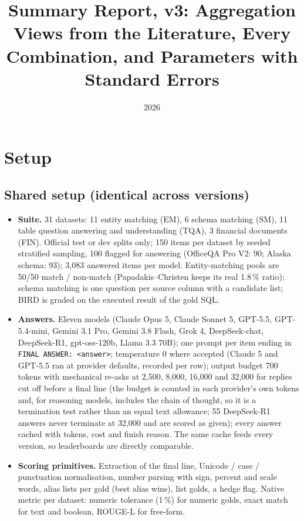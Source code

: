 \documentclass[11pt]{article}
\title{Summary Report, v3: Aggregation Views from the Literature, Every Combination, and Parameters with Standard Errors}
\author{}
\date{2026}
\begin{document}
\maketitle

\section{Setup}

\subsection{Shared setup (identical across versions)}
\begin{itemize}
\item \textbf{Suite.} 31 datasets: 11 entity matching (EM), 6 schema matching (SM), 11 table question answering and understanding (TQA), 3 financial documents (FIN). Official test or dev splits only; 150 items per dataset by seeded stratified sampling, 100 flagged for answering (OfficeQA Pro V2: 90; Alaska schema: 93); 3,083 answered items per model. Entity-matching pools are 50/50 match / non-match (Papadakis--Christen keeps its real 1.8\,\% ratio); schema matching is one question per source column with a candidate list; BIRD is graded on the executed result of the gold SQL.
\item \textbf{Answers.} Eleven models (Claude Opus 5, Claude Sonnet 5, GPT-5.5, GPT-5.4-mini, Gemini 3.1 Pro, Gemini 3.8 Flash, Grok 4, DeepSeek-chat, DeepSeek-R1, gpt-oss-120b, Llama 3.3 70B); one prompt per item ending in \texttt{FINAL ANSWER: <answer>}; temperature 0 where accepted (Claude 5 and GPT-5.5 ran at provider defaults, recorded per row); output budget 700 tokens with mechanical re-asks at 2,500, 8,000, 16,000 and 32,000 for replies cut off before a final line (the budget is counted in each provider's own tokens and, for reasoning models, includes the chain of thought, so it is a termination test rather than an equal text allowance; 55 DeepSeek-R1 answers never terminate at 32,000 and are scored as given); every answer cached with tokens, cost and finish reason. The same cache feeds every version, so leaderboards are directly comparable.
\item \textbf{Scoring primitives.} Extraction of the final line, Unicode / case / punctuation normalisation, number parsing with sign, percent and scale words, alias lists per gold (best alias wins), list golds, a hedge flag. Native metric per dataset: numeric tolerance (1\,\%) for numeric golds, exact match for text and boolean, ROUGE-L for free-form.

\end{itemize}
\end{document}
